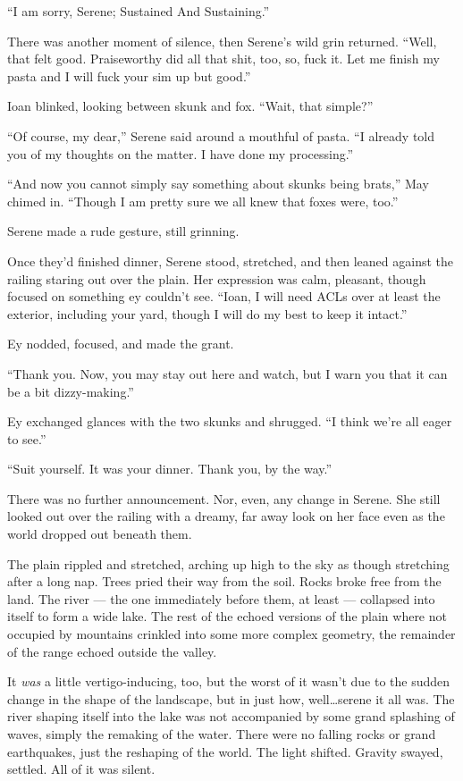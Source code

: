 ``I am sorry, Serene; Sustained And Sustaining.''

There was another moment of silence, then Serene's wild grin returned. ``Well, that felt good. Praiseworthy did all that shit, too, so, fuck it. Let me finish my pasta and I will fuck your sim up but good.''

Ioan blinked, looking between skunk and fox. ``Wait, that simple?''

``Of course, my dear,'' Serene said around a mouthful of pasta. ``I already told you of my thoughts on the matter. I have done my processing.''

``And now you cannot simply say something about skunks being brats,'' May chimed in. ``Though I am pretty sure we all knew that foxes were, too.''

Serene made a rude gesture, still grinning.

Once they'd finished dinner, Serene stood, stretched, and then leaned against the railing staring out over the plain. Her expression was calm, pleasant, though focused on something ey couldn't see. ``Ioan, I will need ACLs over at least the exterior, including your yard, though I will do my best to keep it intact.''

Ey nodded, focused, and made the grant.

``Thank you. Now, you may stay out here and watch, but I warn you that it can be a bit dizzy-making.''

Ey exchanged glances with the two skunks and shrugged. ``I think we're all eager to see.''

``Suit yourself. It was your dinner. Thank you, by the way.''

There was no further announcement. Nor, even, any change in Serene. She still looked out over the railing with a dreamy, far away look on her face even as the world dropped out beneath them.

The plain rippled and stretched, arching up high to the sky as though stretching after a long nap. Trees pried their way from the soil. Rocks broke free from the land. The river — the one immediately before them, at least — collapsed into itself to form a wide lake. The rest of the echoed versions of the plain where not occupied by mountains crinkled into some more complex geometry, the remainder of the range echoed outside the valley.

It \emph{was} a little vertigo-inducing, too, but the worst of it wasn't due to the sudden change in the shape of the landscape, but in just how, well\ldots serene it all was. The river shaping itself into the lake was not accompanied by some grand splashing of waves, simply the remaking of the water. There were no falling rocks or grand earthquakes, just the reshaping of the world. The light shifted. Gravity swayed, settled. All of it was silent.

